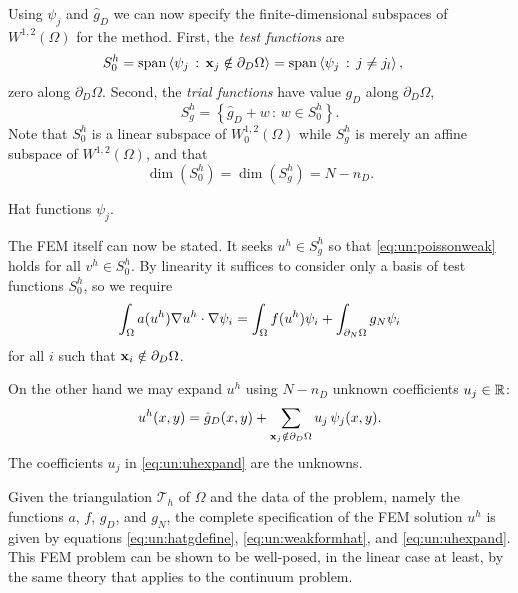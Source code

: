 Using $\psi_j$ and $\hat g_D$ we can now specify the finite-dimensional subspaces of $W^{1,2}(\Omega)$ for the method.  First, the \emph{test functions} are
\begin{align*}
S_{0}^h &= \operatorname{span}\left<\psi_j \,:\, \mathbf{x}_j \notin \partial_D \Omega\right> = \operatorname{span}\left<\psi_j \,:\, j \neq j_l\right>,
\end{align*}
zero along $\partial_D \Omega$.  Second, the \emph{trial functions} have value $g_D$ along $\partial_D \Omega$,
\begin{equation}
S_{g}^h = \left\{\hat g_D + w \,:\, w \in S_{0}^h\right\}.
\end{equation}
Note that $S_{0}^h$ is a linear subspace of $W^{1,2}_0(\Omega)$ while $S_{g}^h$ is merely an affine subspace of $W^{1,2}(\Omega)$, and that
\begin{equation}
\dim(S_{0}^h)=\dim(S_{g}^h)=N-n_D.
\end{equation}

\begin{marginfigure}

\caption{Hat functions $\psi_j$.}
\label{fig:un:hatfunction}
\end{marginfigure}

The FEM itself can now be stated.  It seeks $u^h\in S_{g}^h$ so that \eqref{eq:un:poissonweak} holds for all $v^h\in S_{0}^h$.  By linearity it suffices to consider only a basis of test functions $S_{0}^h$, so we require
\begin{equation}
\int_\Omega a(u^h) \nabla u^h \cdot \nabla \psi_i = \int_\Omega f(u^h) \psi_i + \int_{\partial_N\Omega} g_N \psi_i \label{eq:un:weakformhat}
\end{equation}
for all $i$ such that $\mathbf{x}_i \notin \partial_D \Omega$.

On the other hand we may expand $u^h$ using $N-n_D$ unknown coefficients $u_j\in\mathbb{R}$:
\begin{equation}
u^h(x,y) = \hat g_D(x,y) + \sum_{\mathbf{x}_j \notin \partial_D \Omega} u_j\, \psi_j(x,y). \label{eq:un:uhexpand}
\end{equation}
The coefficients $u_j$ in \eqref{eq:un:uhexpand} are the unknowns.

Given the triangulation $\mathcal{T}_h$ of $\Omega$ and the data of the problem, namely the functions $a$, $f$, $g_D$, and $g_N$, the complete specification of the FEM solution $u^h$ is given by equations \eqref{eq:un:hatgdefine}, \eqref{eq:un:weakformhat}, and \eqref{eq:un:uhexpand}.  This FEM problem can be shown to be well-posed, in the linear case at least, by the same theory that applies to the continuum problem.

